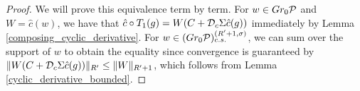 \begin{proof}
We will prove this equivalence term by term. For $w\in Gr_0\mathcal{P}$ and $W=\hat{c}(w)$, we have that $\hat{c}\circ T_1(g) = W(C+\mathcal D_c\Sigma \hat{c}(g))$ immediately by Lemma \ref{composing_cyclic_derivative}. For $w\in (Gr_0\mathcal{P})^{(R'+1,\sigma)}_{c.s.}$, we can sum over the support of $w$ to obtain the equality since convergence is guaranteed by $\|W(C+\mathcal D_c\Sigma \hat{c}(g))\|_{R'}\leq \|W\|_{R'+1}$, which follows from Lemma \ref{cyclic_derivative_bounded}.






\begin{comment}
Assume $w\in Gr_0 \mc{P}^\Gamma$ that is a delta function supported on a loop $f_1\cdots f_m$, $f_j\in E$. We will show that if
	\begin{equation*}
	\begin{tikzpicture}[thick, scale=.5]
		\node[left] at (-1,2) {$\tilde{T}_1(u_1,\ldots, u_m)=$};

		\draw[Box] (0, 3) rectangle (3,4); \node at (1.5,3.5) {$u_1$}; \node[marked, scale=.8, above left] at (0,4) {};
		\draw[thickline] (0.75, 4) --++(0,1.5);
		\draw[thick] (1.5, 4) arc(180:0: 1.3cm and 1cm) --+(0,-1) arc (0:-90: 1.2 cm and 1cm) -- (2, 2) arc(90:180:.5cm);
		\draw[thickline] (2.25,4) arc(180:0: .6cm and .5cm) --++(0,-1) arc(0:-90:.5cm) --++(-3,0) arc(-90:-180:.5cm) --++(0,2.5);

		\node at (5.25,3.75) {$\cdots$};
	
		\draw[Box] (7, 3) rectangle (10,4); \node at (8.5,3.5) {$u_m$}; \node[marked, scale=.8, above left] at (7,4) {};
		\draw[thickline] (7.75, 4) --++(0,1.5);
		\draw[thick] (8.5, 4) arc(180:0: 1.3cm and 1cm) --++(0,-1) arc (0:-90: 1.2 cm and 1cm) -- (8.75, 2) arc(90:180:.5cm);
		\draw[thickline] (9.25,4) arc(180:0: .6cm and .5cm) --++(0,-1) arc(0:-90:.5cm) --++(-3,0) arc(-90:-180:.5cm) --++(0,2.5);
	
		\draw[Box] (1,.5) rectangle (9,1.5); \node at (5,1) {$w$}; \node[marked,scale=.8, above left] at (1,1.5) {};
	

\end{comment}
\end{proof}
